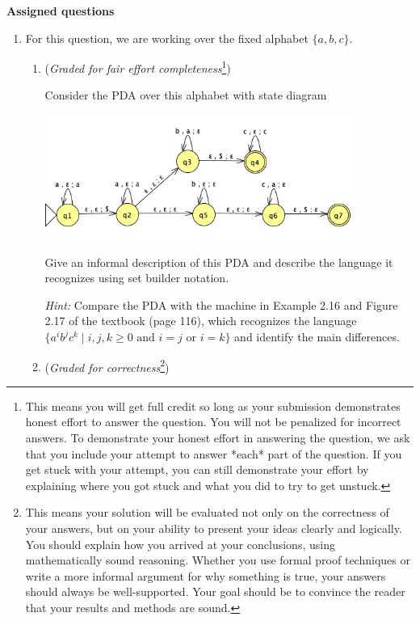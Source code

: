 \documentclass[12pt, oneside]{article}
\begin{document}
\newpage
{\bf Assigned questions}
\begin{enumerate}
    \item For this question, we are working over the fixed alphabet $\{a,b,c\}$.

    \begin{enumerate}
        \item ({\it Graded for fair effort completeness}\footnote{This means 
        you will get full credit so long as your submission demonstrates honest 
        effort to answer the question. You will not be penalized for incorrect answers. 
        To demonstrate your honest effort in answering the question, we ask that you 
        include your attempt to answer *each* part of the question. If you get stuck 
        with your attempt, you can still demonstrate your effort by explaining where 
        you got stuck and what you did to try to get unstuck.})

    Consider the PDA over this alphabet with state diagram
        \begin{center}
        \includegraphics[width=4in]{../../resources/machines/hw4PDA.png}
        \end{center}

    Give an informal description of this PDA and describe the language it recognizes using 
    set builder notation.

    {\it Hint:} Compare the PDA with the machine in Example 2.16 and Figure 2.17 
    of the textbook (page 116), which recognizes 
    the language $\{a^i b^j c^k \mid i,j,k \geq 0 \textrm{ and } i=j \textrm{ or } i=k\}$ and 
    identify the main differences. 

    \item  ({\it Graded for correctness}\footnote{This means your solution will be
    evaluated not only on the correctness of your answers, but on your ability to 
    present your ideas clearly and logically. You should explain how you arrived at 
    your conclusions, using  mathematically sound reasoning. Whether you use formal proof techniques or 
    write a more informal argument for why 
    something is true, your answers should always be well-supported. Your goal 
    should be to convince the reader that 
    your results and methods are sound.}) 


\end{enumerate}
\end{enumerate}
\end{document}
